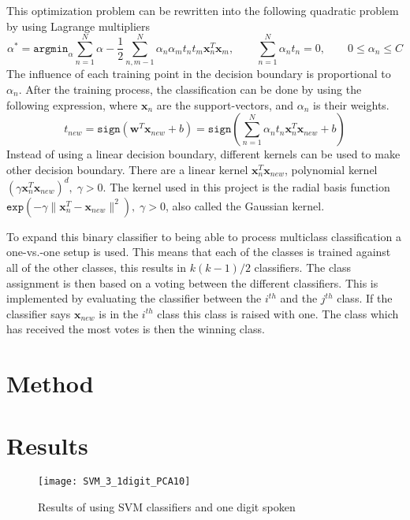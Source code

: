 This optimization problem can be rewritten into the following quadratic problem by using Lagrange multipliers
\begin{equation}
\alpha^* = 
\mathtt{argmin}_\alpha \sum_{n=1}^{N}\alpha - \frac{1}{2} 
\sum_{n,m-1}^{N} \alpha_n \alpha_m t_n t_m \mathbf{x}^T_n \mathbf{x}_m, 
\qquad \sum_{n=1}^{N} \alpha_n t_n = 0, \qquad
0\leq \alpha_n \leq C 
\end{equation}
The influence of each training point in the decision boundary is proportional to $ \alpha_n $.
After the training process, the classification can be done by using the following expression, where $ \mathbf{x}_n $  are the support-vectors, and $ \alpha_n $ is their weights.
\begin{equation}
t_{new} = 
\mathtt{sign}(\mathbf{w}^T \mathbf{x}_{new} +b) =
\mathtt{sign}\left( \sum_{n=1}^{N} \alpha_n t_n \mathbf{x}^T_n \mathbf{x}_{new} +b  \right) 
\end{equation} 
Instead of using a linear decision boundary, different kernels can be used to make other decision boundary.
There are a linear kernel $ \mathbf{x}^T_n \mathbf{x}_{new} $, polynomial kernel $ (\gamma \mathbf{x}^T_n \mathbf{x}_{new} )^d,\; \gamma > 0 $.
The kernel used in this project is the radial basis function $ \mathtt{exp}(-\gamma \|\mathbf{x}^T_n - \mathbf{x}_{new} \|^2 ), \; \gamma > 0 $, also called the Gaussian kernel.

To expand this binary classifier to being able to process multiclass classification a one-vs.-one setup is used. 
This means that each of the classes is trained against all of the other classes, this results in $ k(k-1)/2 $ classifiers. 
The class assignment is then based on a voting between the different classifiers. 
This is implemented by evaluating the classifier between the $ i^{th} $ and the $ j^{th} $ class.
If the classifier says $ \mathbf{x}_{new} $ is in the $ i^{th} $ class this class is raised with one.
The class which has received the most votes is then the winning class.
 
\section{Method}


\section{Results}

\begin{figure}[H]
\centering
\texttt{[image: SVM\_3\_1digit\_PCA10]}
\caption{Results of using SVM classifiers and one digit spoken}
\label{fig:SVM3_1dig_PCA}
\end{figure}

